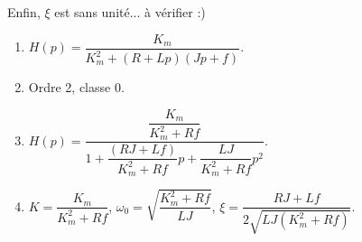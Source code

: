 Enfin, $\xi$ est sans unité... à vérifier :)
%
%
%
%
%
%

\else
\fi




\ifprof
\else

\ifcolle
\else
\begin{corrige}
\begin{enumerate}
    \item $H(p)=\dfrac{K_m}{K_m^2 +\left(R +Lp\right) \left( Jp +f \right)} $.
    \item Ordre 2, classe 0.
    \item $H(p)=\dfrac{\dfrac{K_m}{K_m^2+ Rf}}{1 +\dfrac{\left(RJ  + Lf\right)}{K_m^2+ Rf} p + \dfrac{LJ}{K_m^2+ Rf}p^2 } $.
    \item $K = \dfrac{K_m}{K_m^2+ Rf}$,
$\omega_0=\sqrt{\dfrac{K_m^2+ Rf}{LJ}}$,
$\xi = \dfrac{RJ  + Lf}{2\sqrt{{LJ\left(K_m^2+ Rf\right)}}}$.
\end{enumerate}
\end{corrige}

\fi
{}
\fi